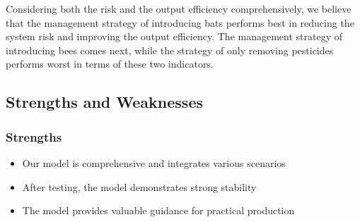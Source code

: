 \documentclass[12pt]{article}  %
\begin{document}
Considering both the risk and the output efficiency comprehensively, we believe that the management strategy of introducing bats performs best in reducing the system risk and improving the output efficiency. The management strategy of introducing bees comes next, while the strategy of only removing pesticides performs worst in terms of these two indicators.





\subsection{Strengths and Weaknesses}
\subsubsection{Strengths}
\begin{itemize}
    \item Our model is comprehensive and integrates various scenarios
    \item After testing, the model demonstrates strong stability
    \item The model provides valuable guidance for practical production
 \end{itemize}
\end{document}
